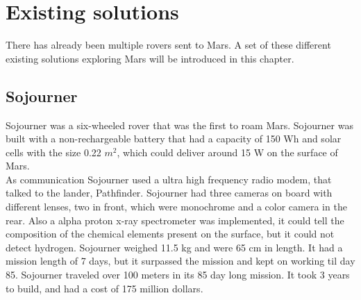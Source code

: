 \chapter{Existing solutions}\label{ch:existingSolutions}
There has already been multiple rovers sent to Mars. A set of these different existing solutions exploring Mars will be introduced in this chapter.

\section{Sojourner}\label{ch:existingSolutions_SojournerRover}
Sojourner was a six-wheeled rover that was the first to roam Mars.
Sojourner was built with a non-rechargeable battery that had a capacity of 150 Wh and solar cells with the size 0.22 \begin{math}m^2\end{math}, which could deliver around 15 W on the surface of Mars.\\ As communication Sojourner used a ultra high frequency radio modem, that talked to the lander, Pathfinder. Sojourner had three cameras on board with different lenses, two in front, which were monochrome and a color camera in the rear. Also a alpha proton x-ray spectrometer was implemented, it could tell the composition of the chemical elements present on the surface, but it could not detect hydrogen. Sojourner weighed 11.5 kg and were 65 cm in length. It had a mission length of 7 days, but it surpassed the mission and kept on working til day 85. Sojourner traveled over 100 meters in its 85 day long mission. It took 3 years to build, and had a cost of 175 million dollars\cite{Sojounerroverjpl}.

